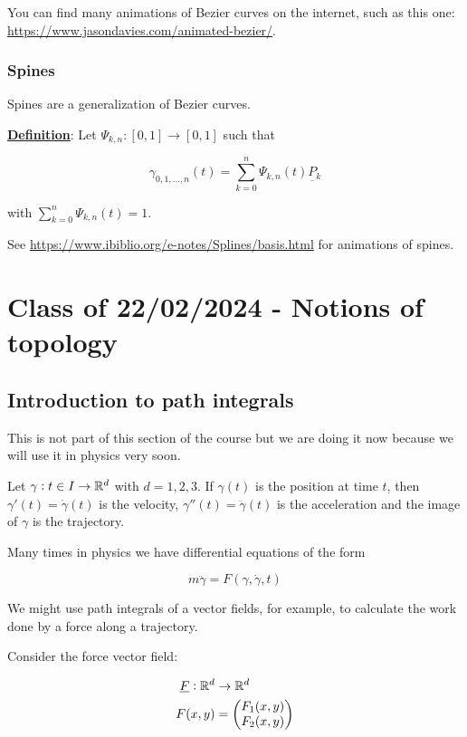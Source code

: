 \documentclass[10pt]{extarticle}
\renewcommand{\vec}[1]{\underbar{\ensuremath{#1}}}
\begin{document}
You can find many animations of Bezier curves on the internet, such as this one: \url{https://www.jasondavies.com/animated-bezier/}.

\subsubsection{Spines}

Spines are a generalization of Bezier curves.

\textbf{\underline{Definition}}: Let $\Psi_{k, n}: [0, 1]\to [0, 1]$ such that

$$
    \gamma_{0,1, \ldots, n}(t) = \sum_{k=0}^n \Psi_{k, n}(t) \vec{P_k}
$$

with $\sum_{k=0}^n \Psi_{k, n}(t) = 1$.

See \url{https://www.ibiblio.org/e-notes/Splines/basis.html} for animations of spines.

\section{Class of 22/02/2024 - Notions of topology}


\subsection{Introduction to path integrals}

This is not part of this section of the course but we are doing it now because we will use it in physics very soon.

Let $\gamma: t \in I \to \mathbb{R}^d$ with $d = 1, 2, 3$.
If $\gamma(t)$ is the position at time $t$, then $\gamma'(t) = \dot{\gamma}(t)$ is the velocity, $\gamma''(t) = \ddot{\gamma}(t)$ is the acceleration and the image of $\gamma$ is the trajectory.

Many times in physics we have differential equations of the form

$$
    m \ddot{\gamma} = F(\gamma, \dot{\gamma}, t)
$$

We might use path integrals of a vector fields, for example, to calculate the work done by a force along a trajectory.

Consider the force vector field:

\begin{align*}
    \vec{F}: \R^d & \to \R^d                \\
    F(x,y)              & = \begin{pmatrix}
                                F_1(x, y) \\ F_2(x, y)
                            \end{pmatrix}
\end{align*}
\end{document}

